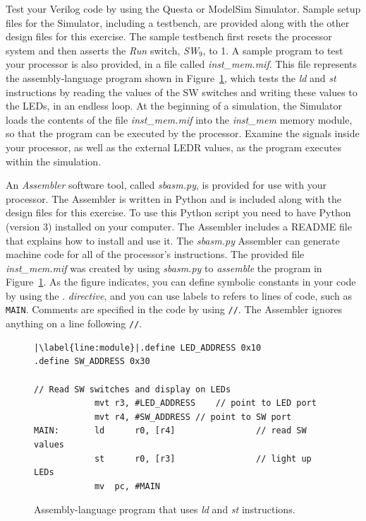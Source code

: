 \documentclass[epsfig,10pt,fullpage]{article} \addtolength{\textwidth}{1.5in}
\newcommand{\blue}[1]{{\color{blue}\sf{#1}}}
\begin{document}
\begin{enumerate}
Test your Verilog code by using the Questa or ModelSim
Simulator. Sample setup files for the Simulator, including a testbench, are provided along with 
the other design files for this exercise.  The sample testbench first resets the processor system
and then asserts the {\it Run} switch, {\it SW}$_9$, to 1. A sample program to test your 
processor is also provided, in a file called {\it inst\_mem.mif}. This file represents the 
assembly-language program shown in Figure~\ref{fig:assembly}, which tests 
the {\it ld} and {\it st} instructions by reading the values of the SW switches and writing 
these values to the LEDs, in an endless loop. At the beginning of a simulation, the Simulator 
loads the contents of the file {\it inst\_mem.mif} into the {\it inst\_mem} memory module, so
that the program can be executed by the processor.  Examine the signals inside 
your processor, as well as the external LEDR values, as the program executes within the
simulation.

An {\it Assembler} software tool, called {\it sbasm.py}, is provided for use with your processor.
The Assembler is written in Python and is included along with the design files for this exercise.
To use this Python script you need to have Python (version 3) installed on your computer. 
The Assembler includes
a README file that explains how to install and use it. The {\it sbasm.py} Assembler can 
generate machine code for all of the processor's instructions. The provided file 
{\it inst\_mem.mif} was created by using {\it sbasm.py} to {\it assemble} the program in 
Figure~\ref{fig:assembly}. As the figure indicates, you can define symbolic
constants in your code by using the .\blue{define} {\it directive}, and you can use 
labels to refers to lines of code, such as \texttt{MAIN}.
Comments are specified in the code by using \texttt{//}. The Assembler ignores anything 
on a line following \texttt{//}.

\lstset{language=ASM,numbers=none,escapechar=|}
\begin{figure}[H]
\begin{center}
\begin{minipage}[h]{12.5 cm}
\begin{lstlisting}[name=proc]
|\label{line:module}|.define LED_ADDRESS 0x10
.define SW_ADDRESS 0x30

// Read SW switches and display on LEDs
			mvt	r3, #LED_ADDRESS	// point to LED port
			mvt	r4, #SW_ADDRESS	// point to SW port
MAIN:		ld		r0, [r4]				// read SW values
			st		r0, [r3]				// light up LEDs
			mv 	pc, #MAIN
\end{lstlisting}
\end{minipage}
\caption{Assembly-language program that uses {\it ld} and {\it st} instructions.}
\label{fig:assembly}
\end{center}
\end{figure}


\end{enumerate}
\end{document}
